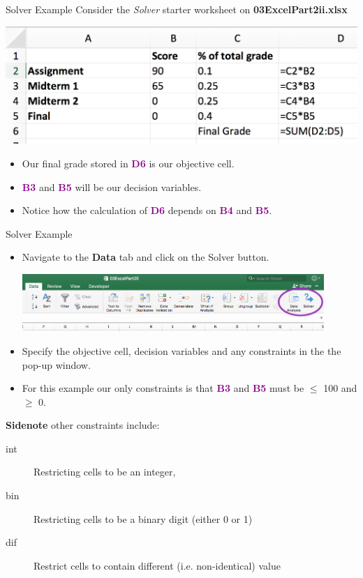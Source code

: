 \documentclass[xcolor=svgnames]{beamer}
\newcommand{\cell}[1]{{\sf \textbf{\textcolor{DarkMagenta}{#1}}}}
\begin{document}
\begin{frame}{Solver Example}
 Consider the \textit{Solver} starter worksheet on {\bf 03ExcelPart2ii.xlsx}
\begin{center}
\includegraphics[height=0.3\textwidth]{solverF}
\end{center}
\begin{itemize}
\item Our final grade stored in \cell{D6} is our objective cell.  
\item \cell{B3} and \cell{B5} will be our decision variables.
\item Notice how the calculation of \cell{D6} depends on \cell{B4} and \cell{B5}.
\end{itemize}
\end{frame}

\begin{frame}{Solver Example}
\begin{itemize}
\item Navigate to the {\bf Data} tab and click on the Solver button.
\begin{center}
\includegraphics[width=0.9\textwidth]{addins}
\end{center}
\item Specify the objective cell, decision variables and any constraints in the the  pop-up window.
\medskip
\item For this example our only constraints is that  \cell{B3} and \cell{B5} must be $\leq$ 100 and $\geq$ 0.
\end{itemize}
{\bf Sidenote} other constraints include:
\begin{description}
\item[int] Restricting cells to be an integer,
\item[bin] Restricting cells to be a binary digit (either 0 or 1)
\item[dif] Restrict cells to contain different (i.e. non-identical) value
\end{description}
\end{frame}
\end{document}

